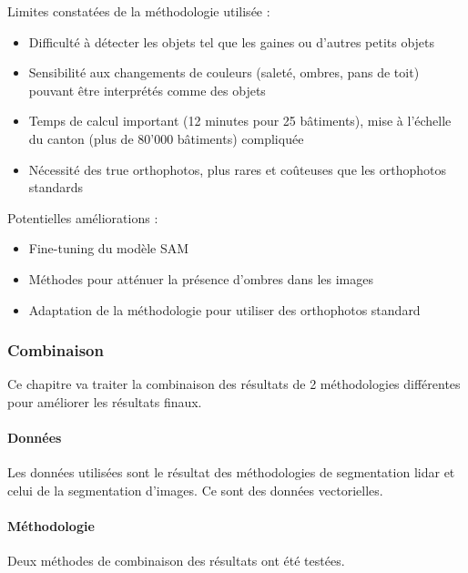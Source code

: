 \par{Limites constatées de la méthodologie utilisée :}
\begin{itemize}
\item Difficulté à détecter les objets tel que les gaines ou d'autres petits objets
\item Sensibilité aux changements de couleurs (saleté, ombres, pans de toit) pouvant être interprétés comme des objets
\item Temps de calcul important (12 minutes pour 25 bâtiments), mise à l'échelle du canton (plus de 80'000 bâtiments) compliquée
\item Nécessité des true orthophotos, plus rares et coûteuses que les orthophotos standards
\end{itemize}

\par{Potentielles améliorations :}
\begin{itemize}
\item Fine-tuning du modèle SAM
\item Méthodes pour atténuer la présence d'ombres dans les images
\item Adaptation de la méthodologie pour utiliser des orthophotos standard
\end{itemize}

\subsubsection{Combinaison}

\par{Ce chapitre va traiter la combinaison des résultats de 2 méthodologies différentes pour améliorer les résultats finaux.}

\paragraph{Données}

\par{Les données utilisées sont le résultat des méthodologies de segmentation \gls{lidar} et celui de la segmentation d'images. Ce sont des données vectorielles.}

\paragraph{Méthodologie}

\par{Deux méthodes de combinaison des résultats ont été testées.}

